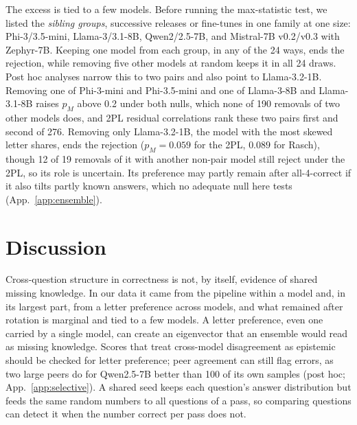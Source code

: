 \documentclass{article}
\theoremstyle{plain}
\theoremstyle{remark}
\begin{document}
The excess is tied to a few models. Before running the max-statistic test, we listed the
\emph{sibling groups}, successive releases or fine-tunes in one family
at one size: Phi-3/3.5-mini, Llama-3/3.1-8B, Qwen2/2.5-7B, and
Mistral-7B v0.2/v0.3 with Zephyr-7B. Keeping one model from each group,
in any of the 24 ways, ends the rejection, while removing five other
models at random keeps it in all 24 draws.
Post hoc analyses narrow this to two pairs and also point to
Llama-3.2-1B. Removing
one of Phi-3-mini and Phi-3.5-mini and one of Llama-3-8B and
Llama-3.1-8B raises $p_M$ above 0.2 under both nulls, which none of 190
removals of two other models does, and 2PL residual correlations rank
these two pairs first and second of 276. Removing only Llama-3.2-1B, the
model with the most skewed letter shares, ends the rejection
($p_M=0.059$ for the 2PL, $0.089$ for Rasch), though 12 of 19
removals of it with another non-pair model still reject under the 2PL,
so its role is uncertain. Its preference may partly remain after
all-4-correct if it also tilts partly known answers, which no adequate
null here tests (App.~\ref{app:ensemble}).

\section{Discussion}
\label{sec:discussion}


Cross-question structure in correctness is not, by itself, evidence of
shared missing knowledge. In our data it came from the pipeline within a
model and, in its largest part, from a letter preference across models,
and what remained after rotation is marginal and tied to a few models. A letter
preference, even one carried by a single model, can create an
eigenvector that an ensemble would read as missing knowledge. Scores that treat cross-model
disagreement as epistemic~\citep{hamidieh2025} should be checked for letter
preference; peer agreement can still flag errors, as two large peers do
for Qwen2.5-7B better than 100 of its own samples (post hoc;
App.~\ref{app:selective}). A shared seed keeps each question's answer
distribution but feeds the same random numbers to all questions of a
pass, so comparing questions can detect it when the number correct per pass
does not.
\end{document}
